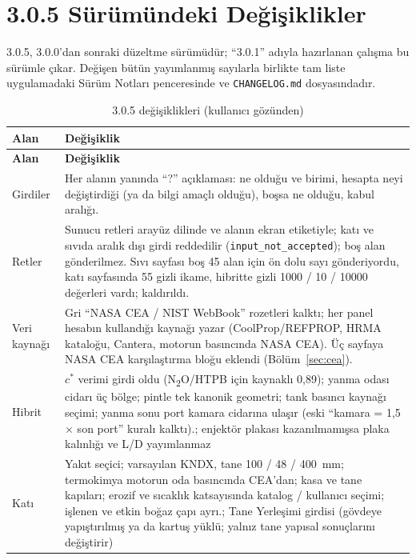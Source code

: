 \documentclass[11pt,a4paper]{article}
\newcommand{\ui}[1]{\textsf{#1}}
\newcommand{\kod}[1]{\texttt{#1}}
\begin{document}
\section{3.0.5 Sürümündeki Değişiklikler}\label{sec:v305}

3.0.5, 3.0.0'dan sonraki düzeltme sürümüdür; ``3.0.1'' adıyla hazırlanan
çalışma bu sürümle çıkar. Değişen bütün yayımlanmış sayılarla birlikte tam
liste uygulamadaki \ui{Sürüm Notları} penceresinde ve \kod{CHANGELOG.md}
dosyasındadır.

\begin{longtable}{@{}>{\raggedright\arraybackslash}p{3.6cm}>{\raggedright\arraybackslash}p{12.0cm}@{}}
\caption{3.0.5 değişiklikleri (kullanıcı gözünden)}\label{tab:v305}\\
\toprule
\textbf{Alan} & \textbf{Değişiklik} \\
\midrule\endfirsthead
\toprule
\textbf{Alan} & \textbf{Değişiklik} \\
\midrule\endhead
\bottomrule\endlastfoot
Girdiler & Her alanın yanında ``?'' açıklaması: ne olduğu ve birimi, hesapta neyi değiştirdiği (ya da bilgi amaçlı olduğu), boşsa ne olduğu, kabul aralığı. \\
Retler & Sunucu retleri arayüz dilinde ve alanın ekran etiketiyle; katı ve sıvıda aralık dışı girdi reddedilir (\kod{input\_\allowbreak{}not\_\allowbreak{}accepted}); boş alan gönderilmez. Sıvı sayfası boş 45 alan için ön dolu sayı gönderiyordu, katı sayfasında 55 gizli ikame, hibritte gizli 1000 / 10 / 10000 değerleri vardı; kaldırıldı. \\
Veri kaynağı & Gri ``NASA CEA / NIST WebBook'' rozetleri kalktı; her panel hesabın kullandığı kaynağı yazar (CoolProp/REFPROP, HRMA kataloğu, Cantera, motorun basıncında NASA CEA). Üç sayfaya NASA CEA karşılaştırma bloğu eklendi (Bölüm~\ref{sec:cea}). \\
Hibrit & $c^*$ verimi girdi oldu (N\textsubscript{2}O/HTPB için kaynaklı 0,89); yanma odası cidarı üç bölge; pintle tek kanonik geometri; tank basıncı kaynağı seçimi; yanma sonu port kamara cidarına ulaşır (eski ``kamara = 1,5 × son port'' kuralı kalktı).; enjektör plakası kazanılmamışsa plaka kalınlığı ve L/D yayımlanmaz \\
Katı & Yakıt seçici; varsayılan KNDX, tane 100 / 48 / 400~mm; termokimya motorun oda basıncında CEA'dan; kasa ve tane kapıları; erozif ve sıcaklık katsayısında katalog / kullanıcı seçimi; işlenen ve etkin boğaz çapı ayrı.; \ui{Tane Yerleşimi} girdisi (gövdeye yapıştırılmış ya da kartuş yüklü; yalnız tane yapısal sonuçlarını değiştirir) \\

\end{longtable}
\end{document}
